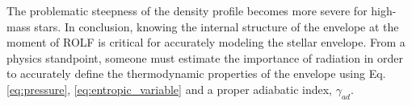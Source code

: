 The problematic steepness of the density profile becomes more severe for high-mass stars. In conclusion, knowing the internal structure of the envelope at the moment of ROLF is critical for accurately modeling the stellar envelope. From a physics standpoint, someone must estimate the importance of radiation in order to accurately define the thermodynamic properties of the envelope using Eq. \eqref{eq:pressure}, \eqref{eq:entropic_variable} and a proper adiabatic index, $\gamma_{ad}$. 

